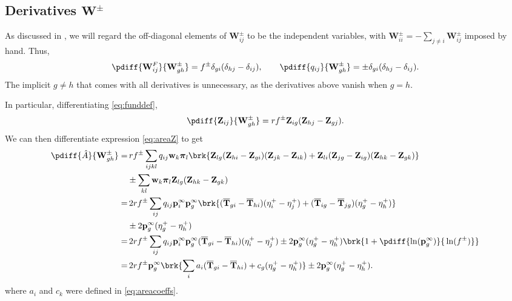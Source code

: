 \documentclass[12pt]{article}
\newcommand{\eq}{\mathbf{p}^\infty}
\newcommand{\fpt}{\mathbf{T}}
\newcommand{\fptb}{\overline{\fpt}}
\newcommand{\fund}{\mathbf{Z}}
\newcommand{\pib}{\boldsymbol{\pi}}
\newcommand{\w}{\mathbf{w}}
\newcommand{\W}{\mathbf{W}}
\begin{document}
\subsection{Derivatives \wrt \texorpdfstring{$\W^\pm$}{W+/-}}\label{sec:deriv}

As discussed in ,
we will regard the off-diagonal elements of $\W^\pm_{ij}$ to be the independent variables,
with $\W^\pm_{ii}=-\sum_{j \neq i} \W^\pm_{ij}$ imposed by hand.
Thus,
%
\begin{equation}\label{eq:basicderivs}
  \pdiff{\W^F_{ij}}{\W^\pm_{gh}} = f^\pm \delta_{gi}(\delta_{hj}-\delta_{ij}),
  \qquad
  \pdiff{q_{ij}}{\W^\pm_{gh}} = \pm\delta_{gi}(\delta_{hj}-\delta_{ij}).
\end{equation}
%
The implicit $g \neq h$ that comes with all derivatives is unnecessary, as the derivatives above vanish when $g=h$.

In particular, differentiating \eqref{eq:funddef},
%
\begin{equation}\label{eq:derivZ}
  \pdiff{\fund_{ij}}{\W^\pm_{gh}} = rf^\pm \fund_{ig} (\fund_{hj}-\fund_{gj}).
\end{equation}
%
We can then differentiate expression \eqref{eq:areaZ} to get
%
\begin{equation}\label{eq:derivA}
  \begin{aligned}
    \pdiff{\hat{A}}{\W^\pm_{gh}} =&\,
      rf^\pm \sum_{ijkl} q_{ij} \w_k \pib_l \brk{
         \fund_{lg}(\fund_{hi}-\fund_{gi})(\fund_{jk}-\fund_{ik}) + \fund_{li}(\fund_{jg}-\fund_{ig})(\fund_{hk}-\fund_{gk}) } \\
    &\pm \sum_{kl} \w_k \pib_l \fund_{lg} (\fund_{hk} - \fund_{gk}) \\
    =&\,
      2rf^\pm \sum_{ij} q_{ij} \eq_i \eq_g \brk{
         (\fptb_{gi}-\fptb_{hi})(\eta^+_{i}-\eta^+_{j}) +
         (\fptb_{ig}-\fptb_{jg})(\eta^+_{g}-\eta^+_{h}) } \\
      &\pm 2 \eq_g (\eta^+_g - \eta^+_h) \\
    =&\,
      2rf^\pm \sum_{ij} q_{ij} \eq_i \eq_g
         (\fptb_{gi}-\fptb_{hi})(\eta^+_{i}-\eta^+_{j})
      \pm 2 \eq_g (\eta^+_g - \eta^+_h)\brk{1+\pdiff{\ln(\eq_g)}{\,\ln(f^\pm)}} \\
    =&\,
      2rf^\pm \eq_g \brk{\sum_i a_i (\fptb_{gi}-\fptb_{hi}) + c_g (\eta^+_{g}-\eta^+_{h})}
      \pm 2 \eq_g (\eta^+_g - \eta^+_h). \\
  \end{aligned}
\end{equation}
%
where $a_i$ and $c_k$ were defined in \eqref{eq:areacoeffs}.
\end{document}

